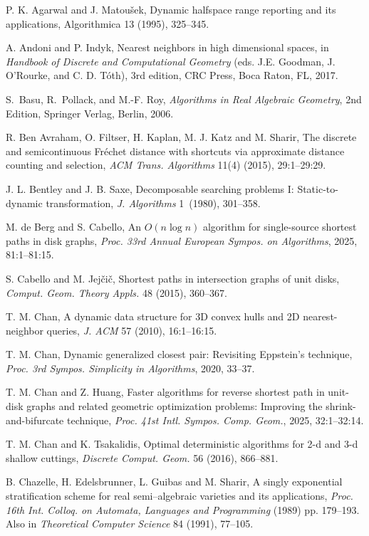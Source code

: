 \documentclass[11pt]{article}
\theoremstyle{definition}
\begin{document}
\begin{thebibliography}{}
P. K. Agarwal and J. Matou\v{s}ek, 
Dynamic halfspace range reporting and its applications,
Algorithmica 13 (1995), 325--345.

	A. Andoni and P. Indyk,
		Nearest neighbors in high dimensional spaces,
		in \emph{Handbook of Discrete and Computational Geometry}
		(eds. J.E. Goodman, J. O'Rourke, and C. D. T\'oth),
		3rd edition, CRC Press, Boca Raton, FL, 2017.

	S.~Basu, R.~Pollack, and M.-F. Roy,
	{\it Algorithms in Real Algebraic Geometry},
	2nd Edition, Springer Verlag, Berlin, 2006.

R. Ben Avraham, O. Filtser, H. Kaplan, M. J. Katz and M. Sharir,
The discrete and semicontinuous Fr\'echet distance with shortcuts via approximate distance counting and selection,
{\it ACM Trans. Algorithms} 11(4) (2015), 29:1--29:29.

J. L. Bentley and J. B. Saxe,
Decomposable searching problems I: Static-to-dynamic transformation,
		\emph{J. Algorithms} 1~(1980), 301--358.

M. de Berg and S. Cabello,
An $O(n\log n)$ algorithm for single-source shortest paths in disk graphs,
{\it Proc. 33rd Annual European Sympos. on Algorithms}, 2025, 81:1--81:15.

S. Cabello and M. Jej\v{c}i\v{c},
Shortest paths in intersection graphs of unit disks,
{\it Comput. Geom. Theory Appls.} 48 (2015), 360--367.

T. M. Chan,
A dynamic data structure for 3D convex hulls and 2D nearest-neighbor queries,
{\it J. ACM} 57 (2010), 16:1--16:15.

T. M. Chan,
Dynamic generalized closest pair: Revisiting Eppstein's technique, 
{\it Proc. 3rd Sympos. Simplicity in Algorithms}, 2020, 33--37.

T. M. Chan and Z. Huang,
Faster algorithms for reverse shortest path in unit-disk graphs and related geometric optimization problems: 
Improving the shrink-and-bifurcate technique, 
{\it Proc. 41st Intl. Sympos. Comp. Geom.}, 2025, 32:1--32:14. 

T. M. Chan and K. Tsakalidis,
Optimal deterministic algorithms for 2-d and 3-d shallow cuttings,
{\it Discrete Comput. Geom.} 56 (2016), 866--881.

B. Chazelle, H. Edelsbrunner, L. Guibas and M. Sharir,
A singly exponential stratification scheme for real semi--algebraic
varieties and its applications,
{\it Proc. 16th Int. Colloq. on Automata, Languages and Programming} (1989) pp. 179--193.
Also in {\it Theoretical Computer Science} 84 (1991), 77--105.


\end{thebibliography}
\end{document}
